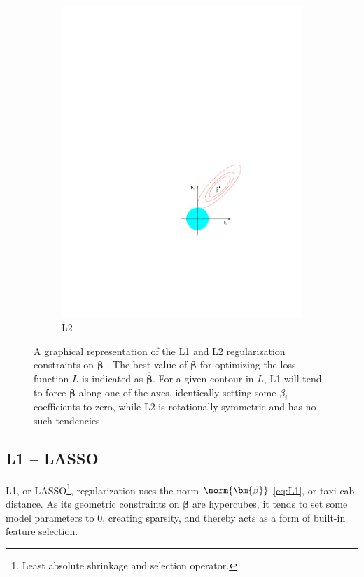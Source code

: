\begin{figure}[H]
\begin{subfigure}[b]{0.48\textwidth}
      \includegraphics[width=\textwidth]{figures/ml/l2}
  \caption{L2}
  \label{fig:ml:l1l2:L2}
  \end{subfigure}
\caption{
A graphical representation of the L1 and L2 regularization constraints on $\bm{\beta}$ \cite{HastieTF09}.
The best value of $\bm{\beta}$ for optimizing the loss function $L$ is indicated as $\hat{\bm{\beta}}$.
For a given contour in $L$, L1 will tend to force $\bm{\beta}$ along one of the axes,
identically setting some $\beta_{i}$ coefficients to zero,
while L2 is rotationally symmetric and has no such tendencies.
\label{fig:ml:l1l2}
}
\end{figure}

\subsection{L1 -- LASSO}
\label{ml_general:reg:L1}

L1, or LASSO\footnote{Least absolute shrinkage and selection operator.},
regularization uses the norm $\norm{\bm{\beta}}$ \cref{eq:L1}, or taxi cab distance.
As its geometric constraints on $\bm{\beta}$ are hypercubes,
it tends to set some model parameters to 0, creating sparsity,
and thereby acts as a form of built-in feature selection.

